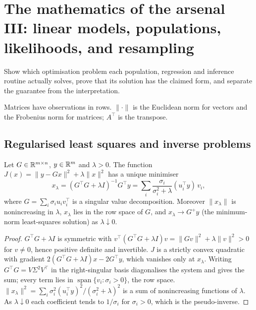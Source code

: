 \chapter[Arsenal III: linear models and inference]{The mathematics of the arsenal III: linear models, populations, likelihoods, and resampling}\label{ch:arsenal-linear}
\begin{readergoal}Show which optimisation problem each population, regression and inference routine actually solves, prove that its solution has the claimed form, and separate the guarantee from the interpretation.\end{readergoal}

Matrices have observations in rows. $\|\cdot\|$ is the Euclidean norm for vectors and the Frobenius norm for matrices; $A^\top$ is the transpose.

\section{Regularised least squares and inverse problems}
\begin{theorem}\label{ars:lin-001}
Let $G\in\mathbb R^{m\times n}$, $y\in\mathbb R^m$ and $\lambda>0$. The function $J(x)=\|y-Gx\|^2+\lambda\|x\|^2$ has a unique minimiser
\[x_\lambda=(G^\top G+\lambda I)^{-1}G^\top y=\sum_{i}\frac{\sigma_i}{\sigma_i^2+\lambda}(u_i^\top y)\,v_i,\]
where $G=\sum_i\sigma_iu_iv_i^\top$ is a singular value decomposition. Moreover $\|x_\lambda\|$ is nonincreasing in $\lambda$, $x_\lambda$ lies in the row space of $G$, and $x_\lambda\to G^+y$ (the minimum-norm least-squares solution) as $\lambda\downarrow0$.
\end{theorem}
\begin{proof}
$G^\top G+\lambda I$ is symmetric with $v^\top(G^\top G+\lambda I)v=\|Gv\|^2+\lambda\|v\|^2>0$ for $v\ne0$, hence positive definite and invertible. $J$ is a strictly convex quadratic with gradient $2(G^\top G+\lambda I)x-2G^\top y$, which vanishes only at $x_\lambda$. Writing $G^\top G=V\Sigma^2V^\top$ in the right-singular basis diagonalises the system and gives the sum; every term lies in $\operatorname{span}\{v_i:\sigma_i>0\}$, the row space. $\|x_\lambda\|^2=\sum_i\sigma_i^2(u_i^\top y)^2/(\sigma_i^2+\lambda)^2$ is a sum of nonincreasing functions of $\lambda$. As $\lambda\downarrow0$ each coefficient tends to $1/\sigma_i$ for $\sigma_i>0$, which is the pseudo-inverse.
\end{proof}

